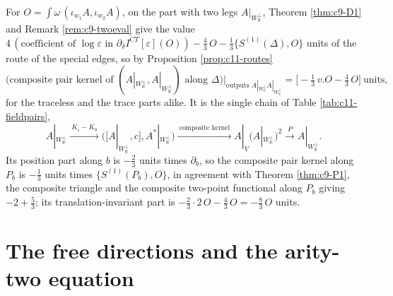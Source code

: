 \begin{example}
\label{ex:c11-bilinear}
For $O=\int\omega\,(\iota_{w_1}A,\iota_{w_2}A)$, on the part with two legs $A|_{W_{\mathbb R}^\perp}$, Theorem \ref{thm:c9-D1} and Remark \ref{rem:c9-twoeval} give the value $4\,(\text{coefficient of }\log\varepsilon\text{ in }\partial_\delta I^{CT}[\varepsilon](O))-\tfrac43\,O-\tfrac13\{S^{(1)}(\Delta),O\}$ units of the route of the special edges, so by Proposition \ref{prop:c11-routes}
\[
\big(\text{composite pair kernel of }(A|_{W_{\mathbb R}^\perp},A|_{W_{\mathbb R}^\perp})\text{ along }\Delta\big)\Big|_{\text{outputs }A|_{W_{\mathbb R}^\perp}A|_{W_{\mathbb R}^\perp}}=\Big[-\tfrac13\,v.O-\tfrac43\,O\Big]\ \text{units},
\]
for the traceless and the trace parts alike. It is the single chain of Table \ref{tab:c11-fieldpairs},
\[
A|_{W_{\mathbb R}^\perp}\xrightarrow{\ K_\varepsilon-K_0\ }\big([A|_{W_{\mathbb R}^\perp},c],A^*|_{W_{\mathbb R}^\perp}\big)\xrightarrow{\ \text{composite kernel}\ }A|_V(A|_{W_{\mathbb R}^\perp})^2\xrightarrow{\ P\ }A|_{W_{\mathbb R}^\perp}.
\]
Its position part along $b$ is $-\tfrac23$ units times $\partial_b$, so the composite pair kernel along $P_b$ is $-\tfrac13$ units times $\{S^{(1)}(P_b),O\}$, in agreement with Theorem \ref{thm:c9-P1}, the composite triangle and the composite two-point functional along $P_b$ giving $-2+\tfrac53$; its translation-invariant part is $-\tfrac23\cdot2\,O-\tfrac43\,O=-\tfrac83\,O$ units.
\end{example}

\section{The free directions and the arity-two equation}

